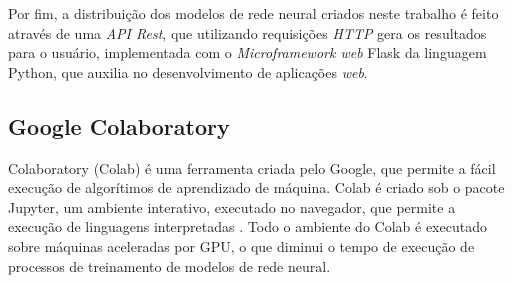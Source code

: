 \par Por fim, a distribuição dos modelos de rede neural criados neste trabalho é feito através de uma \textit{API Rest}, que utilizando requisições \textit{HTTP} gera os resultados para o usuário, implementada com o \textit{Microframework web} Flask da linguagem Python, que auxilia no desenvolvimento de aplicações \textit{web}.





\subsection{Google Colaboratory}

\par Colaboratory (Colab) é uma ferramenta criada pelo Google, que permite a fácil execução de algorítimos de aprendizado de máquina. Colab é criado sob o pacote Jupyter, um ambiente interativo, executado no navegador, que permite a execução de linguagens interpretadas \cite{PER-GRA:2007}. Todo o ambiente do Colab é executado sobre máquinas aceleradas por GPU, o que diminui o tempo de execução de processos de treinamento de modelos de rede neural.

